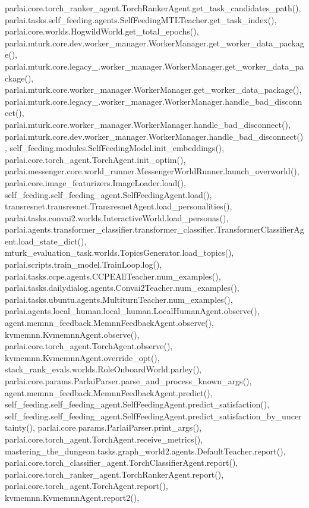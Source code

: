 parlai.\+core.\+torch\+\_\+ranker\+\_\+agent.\+Torch\+Ranker\+Agent.\+get\+\_\+task\+\_\+candidates\+\_\+path(), parlai.\+tasks.\+self\+\_\+feeding.\+agents.\+Self\+Feeding\+M\+T\+L\+Teacher.\+get\+\_\+task\+\_\+index(), parlai.\+core.\+worlds.\+Hogwild\+World.\+get\+\_\+total\+\_\+epochs(), parlai.\+mturk.\+core.\+dev.\+worker\+\_\+manager.\+Worker\+Manager.\+get\+\_\+worker\+\_\+data\+\_\+package(), parlai.\+mturk.\+core.\+legacy\+\_.\+worker\+\_\+manager.\+Worker\+Manager.\+get\+\_\+worker\+\_\+data\+\_\+package(), parlai.\+mturk.\+core.\+worker\+\_\+manager.\+Worker\+Manager.\+get\+\_\+worker\+\_\+data\+\_\+package(), parlai.\+mturk.\+core.\+legacy\+\_.\+worker\+\_\+manager.\+Worker\+Manager.\+handle\+\_\+bad\+\_\+disconnect(), parlai.\+mturk.\+core.\+worker\+\_\+manager.\+Worker\+Manager.\+handle\+\_\+bad\+\_\+disconnect(), parlai.\+mturk.\+core.\+dev.\+worker\+\_\+manager.\+Worker\+Manager.\+handle\+\_\+bad\+\_\+disconnect(), self\+\_\+feeding.\+modules.\+Self\+Feeding\+Model.\+init\+\_\+embeddings(), parlai.\+core.\+torch\+\_\+agent.\+Torch\+Agent.\+init\+\_\+optim(), parlai.\+messenger.\+core.\+world\+\_\+runner.\+Messenger\+World\+Runner.\+launch\+\_\+overworld(), parlai.\+core.\+image\+\_\+featurizers.\+Image\+Loader.\+load(), self\+\_\+feeding.\+self\+\_\+feeding\+\_\+agent.\+Self\+Feeding\+Agent.\+load(), transresnet.\+transresnet.\+Transresnet\+Agent.\+load\+\_\+personalities(), parlai.\+tasks.\+convai2.\+worlds.\+Interactive\+World.\+load\+\_\+personas(), parlai.\+agents.\+transformer\+\_\+classifier.\+transformer\+\_\+classifier.\+Transformer\+Classifier\+Agent.\+load\+\_\+state\+\_\+dict(), mturk\+\_\+evaluation\+\_\+task.\+worlds.\+Topics\+Generator.\+load\+\_\+topics(), parlai.\+scripts.\+train\+\_\+model.\+Train\+Loop.\+log(), parlai.\+tasks.\+ccpe.\+agents.\+C\+C\+P\+E\+All\+Teacher.\+num\+\_\+examples(), parlai.\+tasks.\+dailydialog.\+agents.\+Convai2\+Teacher.\+num\+\_\+examples(), parlai.\+tasks.\+ubuntu.\+agents.\+Multiturn\+Teacher.\+num\+\_\+examples(), parlai.\+agents.\+local\+\_\+human.\+local\+\_\+human.\+Local\+Human\+Agent.\+observe(), agent.\+memnn\+\_\+feedback.\+Memnn\+Feedback\+Agent.\+observe(), kvmemnn.\+Kvmemnn\+Agent.\+observe(), parlai.\+core.\+torch\+\_\+agent.\+Torch\+Agent.\+observe(), kvmemnn.\+Kvmemnn\+Agent.\+override\+\_\+opt(), stack\+\_\+rank\+\_\+evals.\+worlds.\+Role\+Onboard\+World.\+parley(), parlai.\+core.\+params.\+Parlai\+Parser.\+parse\+\_\+and\+\_\+process\+\_\+known\+\_\+args(), agent.\+memnn\+\_\+feedback.\+Memnn\+Feedback\+Agent.\+predict(), self\+\_\+feeding.\+self\+\_\+feeding\+\_\+agent.\+Self\+Feeding\+Agent.\+predict\+\_\+satisfaction(), self\+\_\+feeding.\+self\+\_\+feeding\+\_\+agent.\+Self\+Feeding\+Agent.\+predict\+\_\+satisfaction\+\_\+by\+\_\+uncertainty(), parlai.\+core.\+params.\+Parlai\+Parser.\+print\+\_\+args(), parlai.\+core.\+torch\+\_\+agent.\+Torch\+Agent.\+receive\+\_\+metrics(), mastering\+\_\+the\+\_\+dungeon.\+tasks.\+graph\+\_\+world2.\+agents.\+Default\+Teacher.\+report(), parlai.\+core.\+torch\+\_\+classifier\+\_\+agent.\+Torch\+Classifier\+Agent.\+report(), parlai.\+core.\+torch\+\_\+ranker\+\_\+agent.\+Torch\+Ranker\+Agent.\+report(), parlai.\+core.\+torch\+\_\+agent.\+Torch\+Agent.\+report(), kvmemnn.\+Kvmemnn\+Agent.\+report2(), 